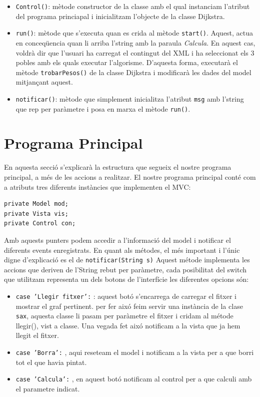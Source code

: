 \documentclass[conference]{IEEEtran}
\begin{document}
\begin{itemize}
    \item \texttt{Control()}: mètode constructor de la classe amb el qual instanciam l'atribut del programa princiapal i inicialitzam l'objecte de la classe Dijkstra.\\
    \item \texttt{run()}: mètode que s'executa quan es crida al mètode \texttt{start()}. Aquest, actua en conceqüencia quan li arriba l'string amb la paraula \textit{Calcula}. En aquest cas, voldrà dir que l'usuari ha carregat el contingut del XML i ha seleccionat els 3 pobles amb els quals executar l'algorisme. D'aquesta forma, executarà el mètode \texttt{trobarPesos()} de la classe Dijkstra i modificarà les dades del model mitjançant aquest.\\
    \item \texttt{notificar()}: mètode que simplement inicialitza l'atribut \texttt{msg} amb l'string que rep per paràmetre i posa en marxa el mètode \texttt{run()}.\\
\end{itemize}
\section{Programa Principal}
    En aquesta secció s'explicarà la estructura que segueix el nostre programa principal, a més de les accions a realitzar. El nostre programa principal conté com a atributs tres diferents instàncies que implementen el MVC:
\begin{verbatim}
private Model mod;
private Vista vis;
private Control con;
\end{verbatim}
    Amb aquests punters podem accedir a l'informació del model i notificar el diferents events enregistrats. En quant als métodes, el més important i l'únic digne d'explicació es el de \texttt{notificar(String s)} Aquest métode implementa les accions que deriven de l'String rebut per paràmetre, cada posibilitat del switch que utilitzam representa un dels botons de l'interfície les diferentes opcions són:
    \begin{itemize}
        \item \texttt{case 'Llegir fitxer':} : aquest botó s'encarrega de carregar el fitxer i mostrar el graf pertinent. per fer aixó feim servir una instància de la clase \texttt{sax}, aquesta classe li pasam per paràmetre el fitxer i cridam al métode llegir(), vist a classe. Una vegada fet aixó notificam a la vista que ja hem llegit el fitxer.\\
        \item \texttt{case 'Borra':} , aqui reseteam el model i notificam a la vista per a que borri tot el que havia pintat.\\
        \item \texttt{case 'Calcula':} , en aquest botó notificam al control per a que calculi amb el parametre indicat.\\
    \end{itemize}
\end{document}
